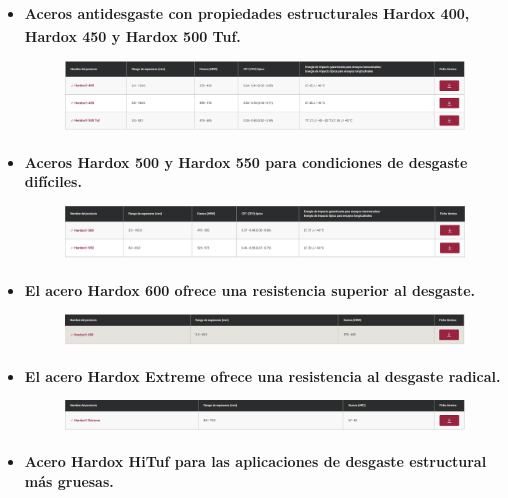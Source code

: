 \documentclass[12pt,a4paper]{article}
\begin{document}
\begin{itemize}
    \item \textbf{Aceros antidesgaste con propiedades estructurales Hardox\textsuperscript{\textregistered} 400, Hardox\textsuperscript{\textregistered} 450 y Hardox\textsuperscript{\textregistered} 500 Tuf.}
    \begin{figure}[H]    
        \centering         
        \includegraphics[width=1\textwidth]{Inagenes para latex/26.png}
    \end{figure}
    \item \textbf{Aceros Hardox\textsuperscript{\textregistered} 500 y Hardox\textsuperscript{\textregistered} 550 para condiciones de desgaste difíciles.}
    \begin{figure}[H]    
        \centering         
        \includegraphics[width=1\textwidth]{Inagenes para latex/27.png}
    \end{figure}
    \item \textbf{El acero Hardox\textsuperscript{\textregistered} 600 ofrece una resistencia superior al desgaste.}
    \begin{figure}[H]    
        \centering         
        \includegraphics[width=1\textwidth]{Inagenes para latex/28.png}
    \end{figure}
    \item \textbf{El acero Hardox\textsuperscript{\textregistered} Extreme ofrece una resistencia al desgaste radical.}
    \begin{figure}[H]    
        \centering         
        \includegraphics[width=1\textwidth]{Inagenes para latex/29.png}
    \end{figure}
    \item \textbf{Acero Hardox\textsuperscript{\textregistered} HiTuf para las aplicaciones de desgaste estructural más gruesas.}

\end{itemize}
\end{document}
